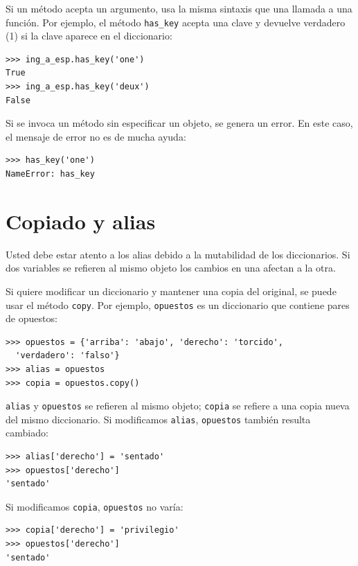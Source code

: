 Si un método acepta un argumento, usa la misma sintaxis que una 
llamada a una función. Por ejemplo, el método \texttt{has\_key} acepta 
una clave y devuelve verdadero (1) si la clave aparece en el diccionario:

\beforeverb
\begin{verbatim}
>>> ing_a_esp.has_key('one')
True
>>> ing_a_esp.has_key('deux')
False
\end{verbatim}
\afterverb
%
Si se invoca un método sin especificar un objeto, se genera 
un error. En este caso, el mensaje de error no es de mucha ayuda:

\beforeverb
\begin{verbatim}
>>> has_key('one')
NameError: has_key
\end{verbatim}
\afterverb
%



\section{Copiado y alias}

Usted debe estar atento a los alias debido a la mutabilidad de los diccionarios. Si dos variables se refieren al mismo objeto los cambios en una afectan a la otra.

Si quiere modificar un diccionario y mantener una copia del original, se
puede usar el método \texttt{copy}. Por ejemplo, \texttt{opuestos} es un diccionario que contiene pares de opuestos:

\beforeverb
\begin{verbatim}
>>> opuestos = {'arriba': 'abajo', 'derecho': 'torcido', 
  'verdadero': 'falso'}
>>> alias = opuestos
>>> copia = opuestos.copy()
\end{verbatim}
\afterverb
%
\texttt{alias} y \texttt{opuestos} se refieren al mismo objeto; \texttt{copia} se refiere a una copia nueva del mismo diccionario. Si modificamos \texttt{alias}, \texttt{opuestos} también resulta cambiado:

\beforeverb
\begin{verbatim}
>>> alias['derecho'] = 'sentado'
>>> opuestos['derecho']
'sentado'
\end{verbatim}
\afterverb
%
Si modificamos \texttt{copia}, \texttt{opuestos} no varía:

\beforeverb
\begin{verbatim}
>>> copia['derecho'] = 'privilegio'
>>> opuestos['derecho']
'sentado'
\end{verbatim}
\afterverb
%



